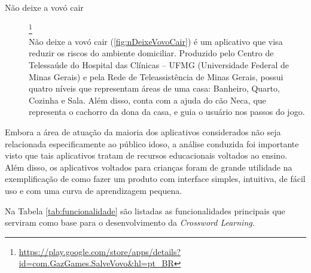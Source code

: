 \begin{description}
\item[Não deixe a vovó cair]\footnote{\url{https://play.google.com/store/apps/details?id=com.GazGames.SalveVovo&hl=pt_BR}} \hfill \\
Não deixe a vovó cair (\autoref{fig:nDeixeVovoCair}) é um aplicativo que visa reduzir os riscos do ambiente domiciliar. Produzido pelo Centro de Telessaúde do Hospital das Clínicas – UFMG (Universidade Federal de Minas Gerais) e pela Rede de Teleassistência de Minas Gerais, possui quatro níveis que representam áreas de uma casa: Banheiro, Quarto, Cozinha e Sala. Além disso, conta com a ajuda do cão Neca, que representa o cachorro da dona da casa, e guia o usuário nos passos do jogo.
    

\end{description}

Embora a área de atuação da maioria dos aplicativos considerados não seja relacionada especificamente ao público idoso, a análise conduzida foi importante visto que tais aplicativos tratam de recursos educacionais voltados ao ensino. Além disso, os aplicativos voltados para crianças foram de grande utilidade na exemplificação de como fazer um produto com interface simples, intuitiva, de fácil uso e com uma curva de aprendizagem pequena. 

Na Tabela \ref{tab:funcionalidade} são listadas as funcionalidades principais que serviram como base para o desenvolvimento da \textit{Crossword Learning}.

